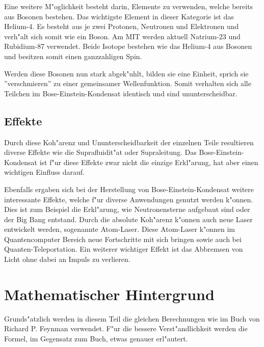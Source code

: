 \begin{refsection}
Eine weitere M"oglichkeit besteht darin, Elemente zu verwenden, welche bereits aus Bosonen bestehen. Das wichtigste Element in dieser Kategorie ist das Helium-4. Es besteht aus je zwei Protonen, Neutronen und Elektronen und verh"alt sich somit wie ein Boson. Am MIT werden aktuell Natrium-23 und Rubidium-87 verwendet. Beide Isotope bestehen wie das Helium-4 aus Bosonen und besitzen somit einen ganzzahligen Spin.

Werden diese Bosonen nun stark abgek"uhlt, bilden sie eine Einheit, sprich sie ''verschmieren'' zu einer gemeinsamer Wellenfunktion. Somit verhalten sich alle Teilchen im Bose-Einstein-Kondensat identisch und sind ununterscheidbar.

\subsection{Effekte}

Durch diese Koh"arenz und Ununterscheidbarkeit der einzelnen Teile resultieren diverse Effekte wie die Suprafluidit"at oder Supraleitung. Das Bose-Einstein-Kondensat ist f"ur diese Effekte zwar nicht die einzige Erkl"arung, hat aber einen wichtigen Einfluss darauf. 

Ebenfalls ergaben sich bei der Herstellung von Bose-Einstein-Kondensat weitere interessante Effekte, welche f"ur diverse Anwendungen genutzt werden k"onnen. Dies ist zum Beispiel die Erkl"arung, wie Neutronensterne aufgebaut sind oder der Big Bang entstand. Durch die absolute Koh"arenz k"onnen auch neue Laser entwickelt werden, sogenannte Atom-Laser. Diese Atom-Laser k"onnen im Quantencomputer Bereich neue Fortschritte mit sich bringen sowie auch bei Quanten-Teleportation. Ein weiterer wichtiger Effekt ist das Abbremsen von Licht ohne dabei an Impuls zu verlieren.


\section{Mathematischer Hintergrund}

Grunds"atzlich werden in diesem Teil die gleichen Berechnungen wie im Buch von Richard P. Feynman \cite{bose:feynman} verwendet. F"ur die bessere Verst"andlichkeit werden die Formel, im Gegensatz zum Buch, etwas genauer erl"autert.


\end{refsection}
